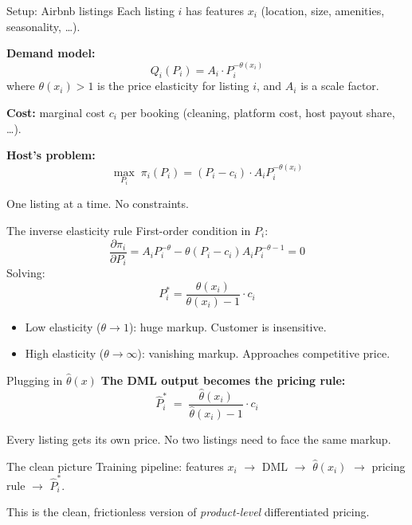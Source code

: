 \documentclass[aspectratio=169, 11pt, handout]{beamer}
\begin{document}
\begin{frame}{Setup: Airbnb listings}
Each listing $i$ has features $x_i$ (location, size, amenities, seasonality, \ldots).
\vspace{0.4em}

\textbf{Demand model:}
\[
Q_i(P_i) = A_i \cdot P_i^{-\theta(x_i)}
\]
where $\theta(x_i) > 1$ is the price elasticity for listing $i$, and $A_i$ is a scale factor.
\vspace{0.6em}

\textbf{Cost:} marginal cost $c_i$ per booking (cleaning, platform cost, host payout share, \ldots).
\vspace{0.6em}

\textbf{Host's problem:}
\[
\max_{P_i} \; \pi_i(P_i) = (P_i - c_i) \cdot A_i P_i^{-\theta(x_i)}
\]
\vspace{0.2em}

One listing at a time. No constraints.  
\end{frame}

\begin{frame}{The inverse elasticity rule}
First-order condition in $P_i$:
\[
\frac{\partial \pi_i}{\partial P_i} = A_i P_i^{-\theta} - \theta (P_i - c_i) A_i P_i^{-\theta - 1} = 0
\]
Solving:
\[
\boxed{\; P_i^* = \frac{\theta(x_i)}{\theta(x_i) - 1} \cdot c_i \;}
\]
\vspace{0.4em}

\begin{itemize}
    \item Low elasticity ($\theta \to 1$): huge markup. Customer is insensitive.
    \item High elasticity ($\theta \to \infty$): vanishing markup. Approaches competitive price.
\end{itemize}
\end{frame}

\begin{frame}{Plugging in $\hat\theta(x)$}
\textbf{The DML output becomes the pricing rule:}
\[
\hat{P}_i^* \;=\; \frac{\hat\theta(x_i)}{\hat\theta(x_i) - 1} \cdot c_i
\]
\vspace{0.4em}

Every listing gets its own price. No two listings need to face the same markup.
\vspace{0.6em}

\begin{block}{The clean picture}
Training pipeline: features $x_i$ $\to$ DML $\to$ $\hat\theta(x_i)$ $\to$ pricing rule $\to$ $\hat{P}_i^*$.
\end{block}
\vspace{0.4em}

This is the clean, frictionless version of \emph{product-level} differentiated pricing. 
\end{frame}
\end{document}
